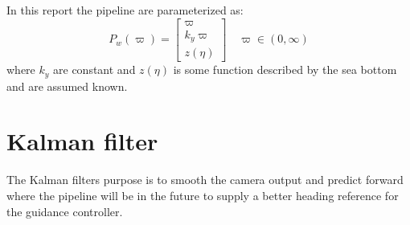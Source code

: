 	In this report the pipeline are parameterized as:
	\begin{equation}
		P_w(\varpi) = \left [ \begin{array}{c}
					\varpi \\
					k_y \varpi \\
					z(\eta)
				\end{array} \right ] \quad \varpi \in (0, \infty)
	\end{equation}
	where $k_y$ are constant and $z(\eta)$ is some function described by the sea bottom and are assumed
	known.
	
	


\section{Kalman filter}
	The Kalman filters purpose is to smooth the camera output and predict forward where the pipeline will
	be in the future to supply a better heading reference for the guidance controller.

